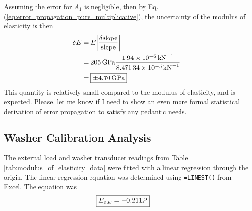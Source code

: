 Assuming the error for $A_1$ is negligible, then by Eq. (\ref{eq:error_propagation_pure_multiplicative}), the uncertainty of the modulus of elasticity is then
\begin{align*}
    \delta E &= E \bigg|\frac{\delta \text{slope}}{\text{slope}}\bigg|\\
    &= \qty{205}{\giga\pascal} \frac{\qty{1.94E-06}{\per\kilo\newton}}{\qty{8.47134E-05}{\per\kilo\newton}} \\
    &= \boxed{\pm \qty{4.70}{\giga\pascal}}
\end{align*}
This quantity is relatively small compared to the modulus of elasticity, and is expected. Please, let me know if I need to show an even more formal statistical derivation of error propagation to satisfy any pedantic needs.

\subsection{Washer Calibration Analysis}
The external load and washer transducer readings from Table \ref{tab:modulus_of_elasticity_data} were fitted with a linear regression through the origin. The linear regression equation was determined using \texttt{=LINEST()} from Excel. The equation was 
\begin{align*}
    \Aboxed{E_{o, w} &= -0.211 P}
\end{align*}
